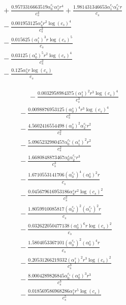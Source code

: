 \documentclass[10pt]{article}
\begin{document}
\begin{align*}
&{}  + \frac{0.9573316663519 \alpha_{0}^{c_s} \alpha_{1}^s r^{4}}{c_{s}^{4}} + \frac{1.981431346653 \alpha_{1}^{c_s} \alpha_{3}^{c_s} r}{c_{s}} \\
&{}  - \frac{0.001953125 \alpha_{4}^s r^{2} \log{\left(c_{s} \right)}^{4}}{c_{s}^{2}} \\
&{}  - \frac{0.015625 \left(\alpha_{1}^s\right)^{3} r \log{\left(c_{s} \right)}^{5}}{c_{s}} \\
&{}  - \frac{0.03125 \left(\alpha_{0}^s\right)^{5} r^{2} \log{\left(c_{s} \right)}^{4}}{c_{s}^{2}} \\
&{}  - \frac{0.125 \alpha_{5}^s r \log{\left(c_{s} \right)}}{c_{s}}
\end{align*}

\begin{align*}
\phantom{R_{1,7}} &\phantom{={}}{}  - \frac{0.0032958984375 \left(\alpha_{1}^s\right)^{2} r^{3} \log{\left(c_{s} \right)}^{4}}{c_{s}^{3}} \\
&{}  - \frac{0.0098876953125 \left(\alpha_{0}^s\right)^{4} r^{3} \log{\left(c_{s} \right)}^{4}}{c_{s}^{3}} \\
&{}  - \frac{4.5602416554498 \left(\alpha_{0}^s\right)^{2} \alpha_{2}^{c_s} r^{2}}{c_{s}^{2}} \\
&{}  - \frac{5.0965232980457 \alpha_{0}^{c_s} \left(\alpha_{1}^s\right)^{2} r^{2}}{c_{s}^{2}} \\
&{}  - \frac{1.6680848873467 \alpha_{0}^s \alpha_{2}^{c_s} r^{3}}{c_{s}^{3}} \\
&{}  - \frac{1.6710553141706 \left(\alpha_{0}^{c_s}\right)^{4} \left(\alpha_{0}^s\right)^{2} r}{c_{s}} \\
&{}  - \frac{0.045679616953186 \alpha_{4}^s r^{2} \log{\left(c_{s} \right)}^{2}}{c_{s}^{2}} \\
&{}  - \frac{1.8059910085817 \left(\alpha_{0}^{c_s}\right)^{2} \left(\alpha_{1}^{c_s}\right)^{2} r}{c_{s}} \\
&{}  - \frac{0.032622050477138 \left(\alpha_{0}^s\right)^{6} r \log{\left(c_{s} \right)}^{2}}{c_{s}} \\
&{}  - \frac{1.5804053367101 \left(\alpha_{0}^{c_s}\right)^{2} \left(\alpha_{0}^s\right)^{4} r}{c_{s}} \\
&{}  - \frac{0.20531266219332 \left(\alpha_{1}^s\right)^{2} r^{3} \log{\left(c_{s} \right)}^{2}}{c_{s}^{3}} \\
&{}  - \frac{8.0004289826845 \alpha_{0}^{c_s} \left(\alpha_{0}^s\right)^{3} r^{3}}{c_{s}^{3}} \\
&{}  - \frac{0.018569586968286 \alpha_{1}^s r^{5} \log{\left(c_{s} \right)}}{c_{s}^{5}} \\

\end{align*}
\end{document}
